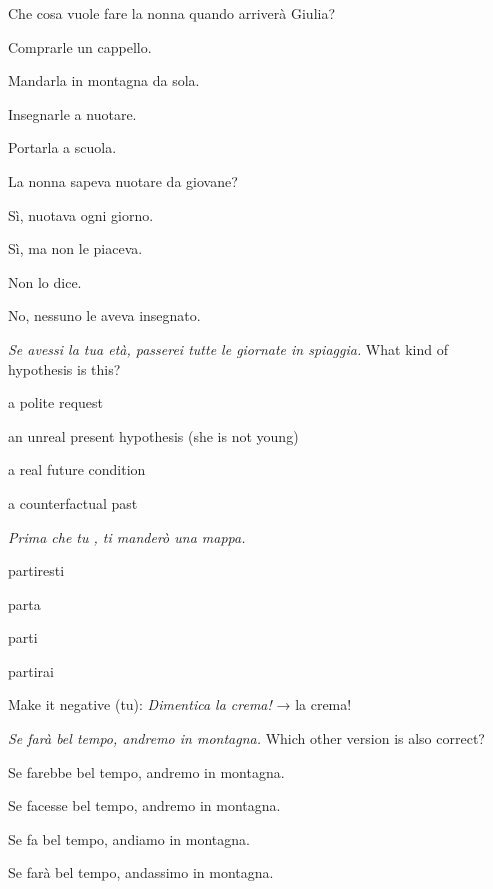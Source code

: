\documentclass[11pt,a4paper,twoside,openright]{book}
\newcommand{\blank}{\underline{\hspace{2.6cm}}}
\begin{document}
\begin{exercises}
\item\label{ex:story-lettera-1}\relax Che cosa vuole fare la nonna quando arriverà Giulia?\par\nopagebreak\begin{options}
\item\relax Comprarle un cappello.
\item\relax Mandarla in montagna da sola.
\item\relax Insegnarle a nuotare.
\item\relax Portarla a scuola.
\end{options}
\item\label{ex:story-lettera-2}\relax La nonna sapeva nuotare da giovane?\par\nopagebreak\begin{options}
\item\relax Sì, nuotava ogni giorno.
\item\relax Sì, ma non le piaceva.
\item\relax Non lo dice.
\item\relax No, nessuno le aveva insegnato.
\end{options}
\item\label{ex:story-lettera-3}\relax \textit{Se avessi la tua età, passerei tutte le giornate in spiaggia.} What kind of hypothesis is this?\par\nopagebreak\begin{options}
\item\relax a polite request
\item\relax an unreal present hypothesis (she is not young)
\item\relax a real future condition
\item\relax a counterfactual past
\end{options}
\item\label{ex:story-lettera-4}\relax \textit{Prima che tu \blank{}, ti manderò una mappa.}\par\nopagebreak\begin{options}
\item\relax partiresti
\item\relax parta
\item\relax parti
\item\relax partirai
\end{options}
\item\label{ex:story-lettera-5}\relax Make it negative (tu): \textit{Dimentica la crema!} → \blank{} la crema!
\item\label{ex:story-lettera-6}\relax \textit{Se farà bel tempo, andremo in montagna.} Which other version is also correct?\par\nopagebreak\begin{options}
\item\relax Se farebbe bel tempo, andremo in montagna.
\item\relax Se facesse bel tempo, andremo in montagna.
\item\relax Se fa bel tempo, andiamo in montagna.
\item\relax Se farà bel tempo, andassimo in montagna.
\end{options}
\end{exercises}
\end{document}

